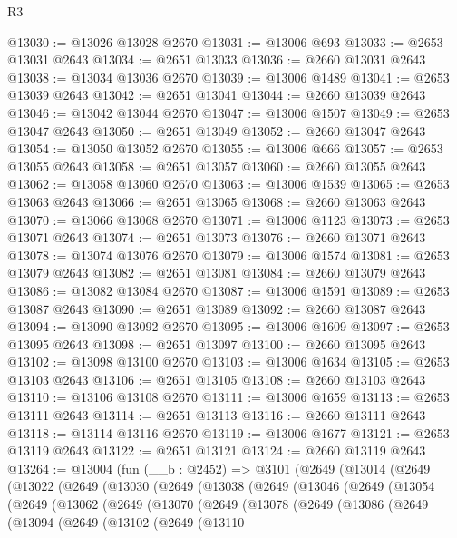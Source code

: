 \begin{lexlean}{R3}
\begin{coremodule}
@13030 := @13026 @13028 @2670
@13031 := @13006 @693
@13033 := @2653 @13031 @2643
@13034 := @2651 @13033
@13036 := @2660 @13031 @2643
@13038 := @13034 @13036 @2670
@13039 := @13006 @1489
@13041 := @2653 @13039 @2643
@13042 := @2651 @13041
@13044 := @2660 @13039 @2643
@13046 := @13042 @13044 @2670
@13047 := @13006 @1507
@13049 := @2653 @13047 @2643
@13050 := @2651 @13049
@13052 := @2660 @13047 @2643
@13054 := @13050 @13052 @2670
@13055 := @13006 @666
@13057 := @2653 @13055 @2643
@13058 := @2651 @13057
@13060 := @2660 @13055 @2643
@13062 := @13058 @13060 @2670
@13063 := @13006 @1539
@13065 := @2653 @13063 @2643
@13066 := @2651 @13065
@13068 := @2660 @13063 @2643
@13070 := @13066 @13068 @2670
@13071 := @13006 @1123
@13073 := @2653 @13071 @2643
@13074 := @2651 @13073
@13076 := @2660 @13071 @2643
@13078 := @13074 @13076 @2670
@13079 := @13006 @1574
@13081 := @2653 @13079 @2643
@13082 := @2651 @13081
@13084 := @2660 @13079 @2643
@13086 := @13082 @13084 @2670
@13087 := @13006 @1591
@13089 := @2653 @13087 @2643
@13090 := @2651 @13089
@13092 := @2660 @13087 @2643
@13094 := @13090 @13092 @2670
@13095 := @13006 @1609
@13097 := @2653 @13095 @2643
@13098 := @2651 @13097
@13100 := @2660 @13095 @2643
@13102 := @13098 @13100 @2670
@13103 := @13006 @1634
@13105 := @2653 @13103 @2643
@13106 := @2651 @13105
@13108 := @2660 @13103 @2643
@13110 := @13106 @13108 @2670
@13111 := @13006 @1659
@13113 := @2653 @13111 @2643
@13114 := @2651 @13113
@13116 := @2660 @13111 @2643
@13118 := @13114 @13116 @2670
@13119 := @13006 @1677
@13121 := @2653 @13119 @2643
@13122 := @2651 @13121
@13124 := @2660 @13119 @2643
@13264 := @13004
    (fun (__b : @2452) =>
    @3101
      (@2649
        (@13014
          (@2649
            (@13022
              (@2649
                (@13030
                  (@2649
                    (@13038
                      (@2649
                        (@13046
                          (@2649
                            (@13054
                              (@2649
                                (@13062
                                  (@2649
                                    (@13070
                                      (@2649
                                        (@13078
                                          (@2649
                                            (@13086
                                              (@2649
                                                (@13094
                                                  (@2649
                                                    (@13102
                                                      (@2649
                                                        (@13110

\end{coremodule}
\end{lexlean}
